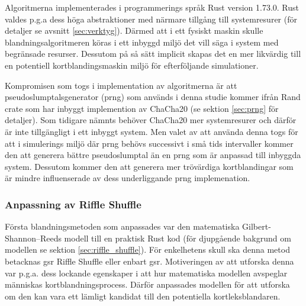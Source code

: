 \documentclass[swedish,a4paper]{article}
\begin{document}
Algoritmerna implementerades i programmerings språk Rust version 1.73.0. Rust
valdes p.g.a dess höga abstraktioner med närmare tillgång till systemresurer
(för detaljer se avsnitt \ref{sec:verktyg}). Därmed att i ett fysiskt maskin
skulle blandningsalgoritmeren köras i ett inbyggd miljö det vill säga i system med
begränsade resurser. Dessutom på så sätt implicit skapas det en mer likvärdig till en
potentiell kortblandingsmaskin miljö för efterföljande simulationer. 

Kompromisen som togs i implementation av algoritmerna är att
pseudoslumptalsgenerator (\gls{prng}) som används i denna studie kommer ifrån
Rand \gls{crate} som har inbyggt implemention av ChaCha20 (se sektion
\ref{sec:prng} för detaljer). Som tidigare nämnts behöver ChaCha20 mer
systemresurer och därför är inte tillgängligt i ett inbyggt system. Men
valet av att använda denna togs för att i simulerings miljö där \gls{prng} behövs
successivt i små tids intervaller kommer den att generera bättre pseudoslumptal
än en \gls{prng} som är anpassad till inbyggda system. Dessutom kommer den att
generera mer trövärdiga kortblandingar som är mindre influenserade av dess
underliggande \gls{prng} implemenation. 

\subsubsection{Anpassning av Riffle Shuffle}

 

Första blandningsmetoden som anpassades var den matematiska
Gilbert-Shannon–Reeds modell till en praktisk Rust kod (för djupgående bakgrund
om modellen se sektion \ref{sec:riffle_shuffle}). För enkelhetens skull ska denna metod
betacknas \gls{gsr} Riffle Shuffle eller enbart \gls{gsr}. Motiveringen av att
utforska denna var  p.g.a. dess lockande egenskaper i att hur matematiska
modellen avspeglar människas kortblandningsprocess. Därför anpassades modellen för att
utforska om den kan vara ett lämligt kandidat till den potentiella
kortleksblandaren.
\end{document}
